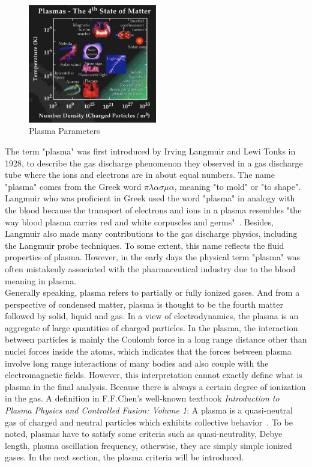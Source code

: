 \begin{figure}[H]
\centering
   \includegraphics[width=0.5\textwidth]{./03.Introduction/fig/plasma_parameter.jpg}
   \caption{Plasma Parameters}
   \label{intro:fig:1}
\end{figure}
\noindent
The term "plasma" was first introduced by Irving Langmuir and Lewi Tonks in 1928, to describe the gas discharge phenomenon they observed in a gas discharge tube where the ions and electrons are in about equal numbers. The name "plasma" comes from the Greek word $\pi\lambda\alpha\sigma\mu\alpha$, meaning "to mold" or "to shape". Langmuir who was proficient in Greek used the word "plasma" in analogy with the blood because the transport of electrons and ions in a plasma resembles "the way blood plasma carries red and white corpuscles and germs"~\cite{langmuir1929tonks}. Besides, Langmuir also made many contributions to the gas discharge physics, including the Langmuir probe techniques. To some extent, this name reflects the fluid properties of plasma. However, in the early days the physical term "plasma" was often mistakenly associated with the pharmaceutical industry due to the blood meaning in plasma.\\[12pt]
Generally speaking, plasma refers to partially or fully ionized gases. And from a perspective of condensed matter, plasma is thought to be the fourth matter followed by solid, liquid and gas. In a view of electrodynamics, the plasma is an aggregate of large quantities of charged particles. In the plasma, the interaction between particles is mainly the Coulomb force in a long range distance other than nuclei forces inside the atoms, which indicates that the forces between plasma involve long range interactions of many bodies and also couple with the electromagnetic fields. However, this interpretation cannot exactly define what is plasma in the final analysis. Because there is always a certain degree of ionization in the gas. A definition in F.F.Chen's well-known textbook \textit{Introduction to Plasma Physics and Controlled Fusion: Volume 1}: A plasma is a quasi-neutral gas of charged and neutral particles which exhibits collective behavior~\cite{chen1986plasma}. To be noted, plasmas have to satisfy some criteria such as quasi-neutrality, Debye length, plasma oscillation frequency, otherwise, they are simply simple ionized gases. In the next section, the plasma criteria will be introduced.


